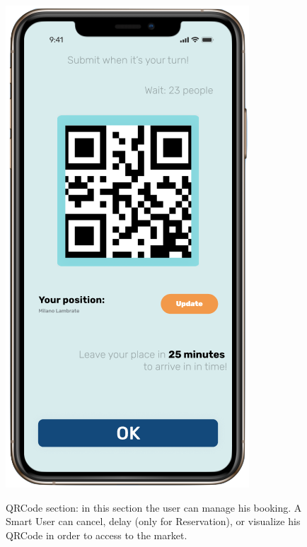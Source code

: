 \begin{figure}[H]
\begin{center}
{            \includegraphics[scale=0.35]{images/mockup/qr_reservation.png}
        }%
%
    \end{center}
    \caption{%
        QRCode section: in this section the user can manage his booking. A Smart User can cancel, delay (only for Reservation), or visualize his QRCode in order to access to the market.
     }%
   \label{fig:subfigures}
\end{figure}


